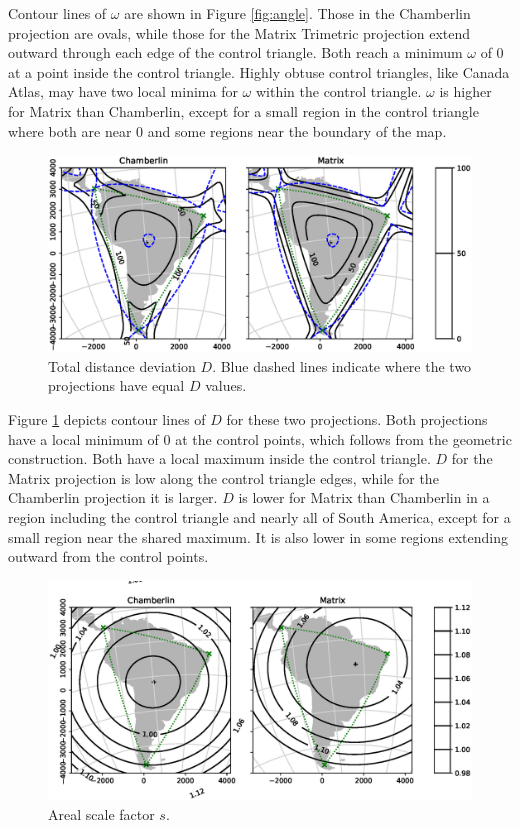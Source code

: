 \documentclass[]{interact}
\begin{document}
Contour lines of $\omega$ are shown in Figure \ref{fig:angle}. Those in the
Chamberlin projection are ovals, while those for the Matrix Trimetric
projection extend outward through each edge of the control triangle. Both
reach a minimum $\omega$ of 0 at a point inside the control triangle. Highly
obtuse control triangles, like Canada Atlas, may have two local minima for
$\omega$ within the control triangle. $\omega$ is higher for Matrix than
Chamberlin, except for a small region in the control triangle where both are
near 0 and some regions near the boundary of the map.

\begin{figure}
  \includegraphics[width=\textwidth]{SA_Wall_Map_distance}
  \caption{Total distance deviation $D$. Blue dashed lines
  indicate where the two projections have equal $D$ values.}
  \label{fig:distance}
\end{figure}

Figure \ref{fig:distance} depicts contour lines of $D$ for these two
projections. Both projections have a local minimum of 0 at the control points,
which follows from the geometric construction. Both have a local maximum inside
the control triangle. $D$ for the Matrix projection is low along the control
triangle edges, while for the Chamberlin projection it is larger. $D$ is
lower for Matrix than Chamberlin in a region including the control triangle and
nearly all of South America, except for a small region near the shared maximum.
It is also lower in some regions extending outward from the control points.

\begin{figure}
  \includegraphics[width=\textwidth]{SA_Wall_Map_scale}
  \caption{Areal scale factor $s$.}
  \label{fig:scale}
\end{figure}
\end{document}

